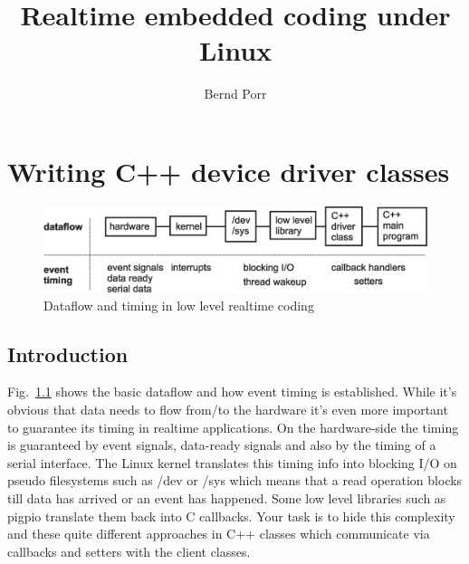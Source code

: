 \documentclass[12pt]{report}
\author{Bernd Porr}
\title{Realtime embedded coding under Linux}
\begin{document}
\maketitle

\tableofcontents

\chapter{Writing C++ device driver classes}

\begin{figure}[!hbt]
\begin{center}
\mbox{\includegraphics[width=\textwidth]{signals-timings}}
\end{center}
\caption{Dataflow and timing in low level realtime coding
\label{timing}}
\end{figure}

\section{Introduction}
Fig.~\ref{timing} shows the basic dataflow and how event timing is
established. While it's obvious that data needs to flow from/to the
hardware it's even more important to guarantee its timing in realtime
applications. On the hardware-side the timing is guaranteed by event
signals, data-ready signals and also by the timing of a serial
interface. The Linux kernel translates this timing info into blocking
I/O on pseudo filesystems such as /dev or /sys which means that a read
operation blocks till data has arrived or an event has happened. Some
low level libraries such as pigpio translate them back into C
callbacks.  Your task is to hide this complexity and these quite
different approaches in C++ classes which communicate via callbacks
and setters with the client classes.
\end{document}
